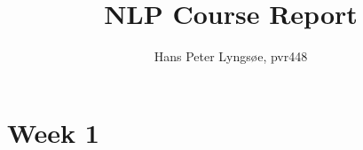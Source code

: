 \documentclass[11pt]{article}
\begin{document}
\nolinenumbers  %


\title{NLP Course Report}
\author{Hans Peter Lyngsøe, pvr448}

\maketitle

\section{Week 1}
\end{document}
